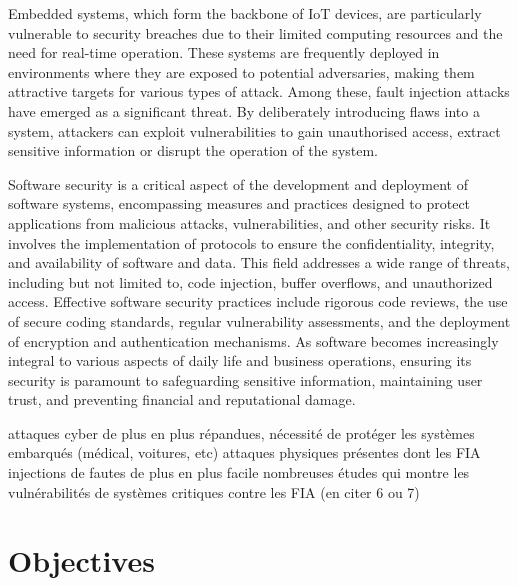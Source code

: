 Embedded systems, which form the backbone of IoT devices, are particularly vulnerable to security breaches due to their limited computing resources and the need for real-time operation. These systems are frequently deployed in environments where they are exposed to potential adversaries, making them attractive targets for various types of attack. Among these, fault injection attacks have emerged as a significant threat. By deliberately introducing flaws into a system, attackers can exploit vulnerabilities to gain unauthorised access, extract sensitive information or disrupt the operation of the system.

Software security is a critical aspect of the development and deployment of software systems, encompassing measures and practices designed to protect applications from malicious attacks, vulnerabilities, and other security risks. It involves the implementation of protocols to ensure the confidentiality, integrity, and availability of software and data. This field addresses a wide range of threats, including but not limited to, code injection, buffer overflows, and unauthorized access. Effective software security practices include rigorous code reviews, the use of secure coding standards, regular vulnerability assessments, and the deployment of encryption and authentication mechanisms. As software becomes increasingly integral to various aspects of daily life and business operations, ensuring its security is paramount to safeguarding sensitive information, maintaining user trust, and preventing financial and reputational damage.

attaques cyber de plus en plus répandues, nécessité de protéger les systèmes embarqués (médical, voitures, etc)
attaques physiques présentes dont les FIA
injections de fautes de plus en plus facile \cite{rayvlite_wired, rayvlite_fraktal}
nombreuses études qui montre les vulnérabilités de systèmes critiques contre les FIA (en citer 6 ou 7)


\section{Objectives}


